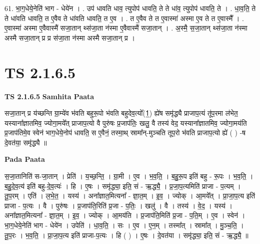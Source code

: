 \documentclass[17pt]{extarticle}
\begin{document}
61. भा॒ग॒धेये॒नेति॑ भाग - धेये॑न । . उप॑ धावति धाव॒ त्युपोप॑ धावति॒ ते ते धा॑व॒ त्युपोप॑ धावति॒ ते । . धा॒व॒ति॒ ते ते धा॑वति धावति॒ त ए॒वैव ते धा॑वति धावति॒ त ए॒व । . त ए॒वैव ते त ए॒वास्मा॑ अस्मा ए॒व ते त ए॒वास्मै᳚ । . ए॒वास्मा॑ अस्मा ए॒वैवास्मै॑ सजा॒तान् थ्स॑जा॒ता न॑स्मा ए॒वैवास्मै॑ सजा॒तान् । . अ॒स्मै॒ स॒जा॒तान् थ्स॑जा॒ता न॑स्मा अस्मै सजा॒तान् प्र प्र स॑जा॒ता न॑स्मा अस्मै सजा॒तान् प्र । \newline
\pagebreak
{}

\section{ TS 2.1.6.5 }

\textbf{TS 2.1.6.5 } \newline
\textbf{Samhita Paata} \newline

सजा॒तान् प्र य॑च्छन्ति ग्रा॒म्ये॑व भ॑वति बहुरू॒पो भ॑वति बहुदेव॒त्यो᳚(1॒) ह्ये॑ष समृ॑द्ध्यै प्राजाप॒त्यं तू॑प॒रमा ल॑भेत॒ यस्याना᳚ज्ञातमिव॒ ज्योगा॒मये᳚त् प्राजाप॒त्यो वै पुरु॑षः प्र॒जाप॑तिः॒ खलु॒ वै तस्य॑ वेद॒ यस्याना᳚ज्ञातमिव॒ ज्योगा॒मय॑ति प्र॒जाप॑तिमे॒व स्वेन॑ भाग॒धेये॒नोप॑ धावति॒ स ए॒वैनं॒ तस्मा॒थ् स्रामा᳚न्-मुञ्चति तूप॒रो भ॑वति प्राजाप॒त्यो ह्ये॑ ( ) -ष दे॒वत॑या॒ समृ॑द्ध्यै ॥ \newline

\textbf{Pada Paata} \newline

स॒जा॒तानिति॑ स-जा॒तान् । प्रेति॑ । य॒च्छ॒न्ति॒ । ग्रा॒मी । ए॒व । भ॒व॒ति॒ । ब॒हु॒रू॒प इति॑ बहु - रू॒पः । भ॒व॒ति॒ । ब॒हु॒दे॒व॒त्य॑ इति॑ बहु-दे॒व॒त्यः॑ । हि । ए॒षः । समृ॑द्ध्या॒ इति॒ सं - ऋ॒द्ध्यै॒ । प्र॒जा॒प॒त्यमिति॑ प्राजा - प॒त्यम् । तू॒प॒रम् । एति॑ । ल॒भे॒त॒ । यस्य॑ । अना᳚ज्ञात॒मित्यना᳚ - ज्ञा॒त॒म् । इ॒व॒ । ज्योक् । आ॒मये᳚त् । प्रा॒जा॒प॒त्य इति॑ प्राजा - प॒त्यः । वै । पुरु॑षः । प्र॒जाप॑ति॒रिति॑ प्र॒जा - प॒तिः॒ । खलु॑ । वै । तस्य॑ । वे॒द॒ । यस्य॑ । अना᳚ज्ञात॒मित्यना᳚ - ज्ञा॒त॒म् । इ॒व॒ । ज्योक् । आ॒मय॑ति । प्र॒जाप॑ति॒मिति॑ प्र॒जा - प॒ति॒म् । ए॒व । स्वेन॑ । भा॒ग॒धेये॒नेति॑ भाग - धेये॑न । उपेति॑ । धा॒व॒ति॒ । सः । ए॒व । ए॒न॒म् । तस्मा᳚त् । स्रामा᳚त् । मु॒ञ्च॒ति॒ । तू॒प॒रः । भ॒व॒ति॒ । प्रा॒जा॒प॒त्य इति॑ प्राजा-प॒त्यः । हि ( ) । ए॒षः । दे॒वत॑या । समृ॑द्ध्या॒ इति॒ सं - ऋ॒द्ध्यै॒ ॥  \newline
\end{document}

